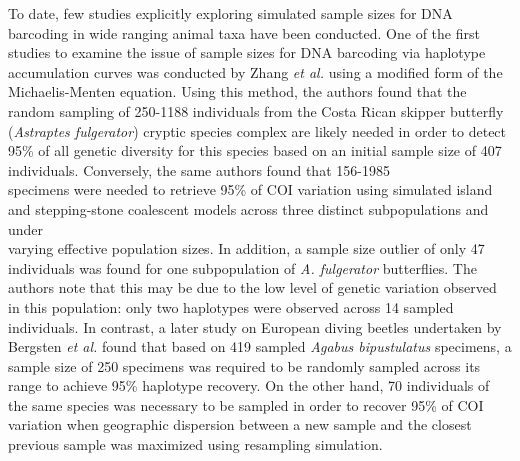 To date, few studies explicitly exploring simulated sample sizes for DNA barcoding in wide ranging animal taxa have been conducted. One of the first studies to examine the issue of sample sizes for DNA barcoding via haplotype accumulation curves was conducted by Zhang \textit{et al.} \cite{zhang2010estimating} using a modified form of the Michaelis-Menten equation. Using this method, the authors found that the random sampling of 250-1188 individuals from the Costa Rican skipper butterfly (\textit{Astraptes fulgerator}) cryptic species complex are likely needed in order to detect 95\% of all genetic diversity for this species based on an initial sample size of 407 individuals. Conversely, the same authors found that 156-1985 \\ specimens were needed to retrieve 95\% of COI variation using simulated island \cite{wright1951genetical} and stepping-stone \cite{kimura1964stepping} coalescent models across three distinct subpopulations and under \\ varying effective population sizes. In addition, a sample size outlier of only 47 individuals was found for one subpopulation of \textit{A. fulgerator} butterflies.  The authors note that this may be due to the low level of genetic variation observed in this population: only two haplotypes were observed across 14 sampled individuals. In contrast, a later study on European diving beetles undertaken by Bergsten \textit{et al.} \cite{bergsten2012effect} found that based on 419 sampled \textit{Agabus bipustulatus} specimens, a sample size of 250 specimens was required to be randomly sampled across its range to achieve 95\% haplotype recovery. On the other hand, 70 individuals of the same species was necessary to be sampled in order to recover 95\% of COI variation when geographic dispersion between a new sample and the closest previous sample was maximized using resampling simulation. 

\vspace{5mm}


